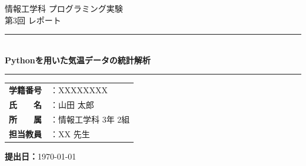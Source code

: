 \documentclass[12pt,a4paper]{ltjsarticle}
\title{} %
\date{}
\author{}
\newcommand{\HRule}{\rule{\linewidth}{0.5mm}}
\begin{document}
\begin{titlepage}
  \thispagestyle{titlepage}
  \centering
  \vspace*{2cm}

  {\large 情報工学科 プログラミング実験}\\[0.5em]
  {\large 第3回 レポート}\\[2em]

  \HRule{}\\[1em]
  {\LARGE \textbf{Pythonを用いた気温データの統計解析}}\\[0.5em]
  \HRule{}

  \vspace{3cm}

  \begin{tabular}{rl}
    \textbf{学籍番号} & ：XXXXXXXX \\[0.4em]
    \textbf{氏　　名} & ：山田 太郎 \\[0.4em]
    \textbf{所　　属} & ：情報工学科 3年 2組 \\[0.4em]
    \textbf{担当教員} & ：XX 先生 \\
  \end{tabular}

  \vfill

  \textbf{提出日：}\today

\end{titlepage}

\newpage
\thispagestyle{frontmatter}
\tableofcontents
\end{document}
